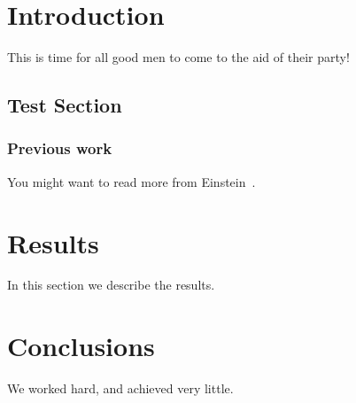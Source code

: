\documentclass[a4paper, 11pt, oneside]{thesis/HSR}  %
\begin{document}

\twocolumn

\mainmatter    %
\pagestyle{fancy}  %









\chapter{Introduction}
This is time for all good men to come to the aid of their party!

\section{Test Section}\label{test section}
\Blindtext
\Blindtext
\Blindtext

\subsection{Previous work}\label{previous work}
You might want to read more from Einstein~\cite{Einstein}.

\chapter{Results}\label{results}
In this section we describe the results.
\Blindtext

\chapter{Conclusions}\label{conclusions}
We worked hard, and achieved very little.
\Blindtext

\end{document}
